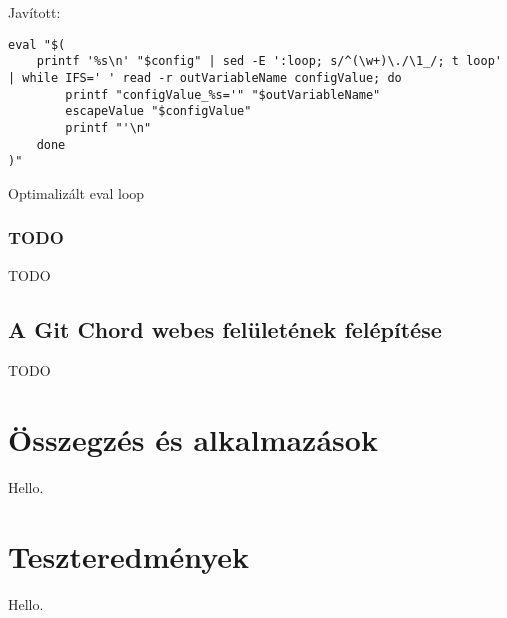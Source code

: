 \documentclass[final]{elteikthesis}[2025/03/25]
\begin{document}
Javított:

\begin{listing}[H]
\begin{verbatim}
eval "$(
    printf '%s\n' "$config" | sed -E ':loop; s/^(\w+)\./\1_/; t loop' | while IFS=' ' read -r outVariableName configValue; do
        printf "configValue_%s='" "$outVariableName"
        escapeValue "$configValue"
        printf "'\n"
    done
)"
\end{verbatim}
\caption{Optimalizált eval loop}
\end{listing}

\subsection{TODO}

TODO

\section{A Git Chord webes felületének felépítése}

TODO

\cleardoublepage

\chapter{Összegzés és alkalmazások}

Hello.

\cleardoublepage

\appendix

\chapter{Teszteredmények}

Hello.

\cleardoublepage

{}
\printbibliography[title=\biblabel]
\cleardoublepage

{}
\listoffigures
\cleardoublepage

{}
\listoftables
\cleardoublepage

{}
\listofalgorithms
\cleardoublepage

{}
\lstlistoflistings
\cleardoublepage
\end{document}
